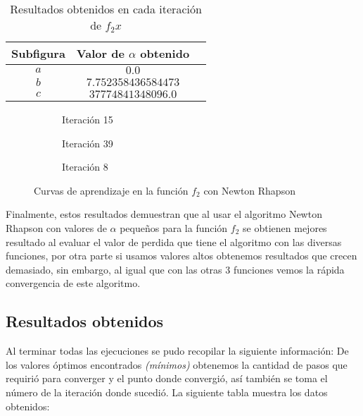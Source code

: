 \begin{table}[H]
    \centering
    \caption{Resultados obtenidos en cada iteración de $f_2x$}
    \begin{tabular}{|c|c|c|}
    \hline
    \textbf{Subfigura} & \textbf{Valor de $\alpha$ obtenido} \\
    \hline
    $a$ & $ 0.0$ \\
    \hline
    $b$ & $ 7.752358436584473$ \\
    \hline
    $c$ & $ 37774841348096.0$ \\
    \hline
    \end{tabular}
    \label{tab:values_f2_newton}
\end{table}

\begin{figure}[H]
     \centering
     \begin{subfigure}[b]{0.45\textwidth}
         \centering
         
         \caption{Iteración 15}
         \label{fig:Newton-Rhapson-f2-63}
     \end{subfigure}
     \hfill
     \begin{subfigure}[b]{0.45\textwidth}
         \centering
         
         \caption{Iteración 39}
         \label{fig:Newton-Rhapson-f2-32}
     \end{subfigure}
     \hfill
     \begin{subfigure}[b]{0.45\textwidth}
         \centering
         
         \caption{Iteración 8}
         \label{fig:Newton-Rhapson-f2-29}
     \end{subfigure}
        \caption{Curvas de aprendizaje en la función $f_2$ con Newton Rhapson}
        \label{fig:learning-curves-f2}
\end{figure}

Finalmente, estos resultados demuestran que al usar el algoritmo Newton Rhapson con valores de $\alpha$ pequeños para la función $f_2$ se obtienen mejores resultado al evaluar el valor de perdida que tiene el algoritmo con las diversas funciones, por otra parte si usamos valores altos obtenemos resultados que crecen demasiado, sin embargo, al igual que con las otras 3 funciones vemos la rápida convergencia de este algoritmo.

\newpage
\subsection{Resultados obtenidos}
Al terminar todas las ejecuciones se pudo recopilar la siguiente información: De los valores óptimos encontrados \textit{(mínimos)} obtenemos la cantidad de pasos que requirió para converger y el punto donde convergió, así también se toma el número de la iteración donde sucedió. La siguiente tabla muestra los datos obtenidos: \\

